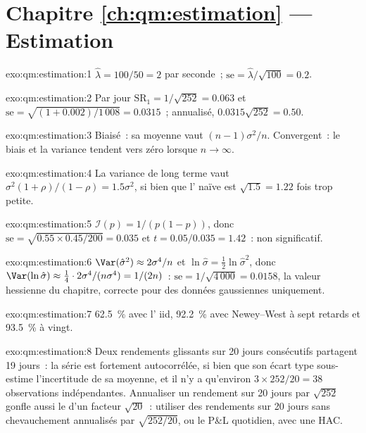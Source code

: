 \section*{Chapitre \ref{ch:qm:estimation} --- Estimation}

\begin{solution}{exo:qm:estimation:1}
$\hat\lambda = 100/50 = 2$ par seconde~; $\mathrm{se} = \hat\lambda/\sqrt{100} = 0.2$.
\end{solution}

\begin{solution}{exo:qm:estimation:2}
Par jour $\mathrm{SR}_1 = 1/\sqrt{252} = 0.063$ et $\mathrm{se} = \sqrt{(1 + 0.002)/1\,008} = 0.0315$~; annualisé, $0.0315\sqrt{252} = 0.50$.
\end{solution}

\begin{solution}{exo:qm:estimation:3}
Biaisé~: sa moyenne vaut $(n - 1)\sigma^2/n$. Convergent~: le biais et la variance tendent vers zéro lorsque $n \to \infty$.
\end{solution}

\begin{solution}{exo:qm:estimation:4}
La variance de long terme vaut $\sigma^2(1 + \rho)/(1 - \rho) = 1.5\sigma^2$, si bien que l' naïve est $\sqrt{1.5} = 1.22$ fois trop petite.
\end{solution}

\begin{solution}{exo:qm:estimation:5}
$\mathcal I(p) = 1/(p(1 - p))$, donc $\mathrm{se} = \sqrt{0.55 \times 0.45/200} = 0.035$ et $t = 0.05/0.035 = 1.42$~: non significatif.
\end{solution}

\begin{solution}{exo:qm:estimation:6}
$\Var(\hat\sigma^2) \approx 2\sigma^4/n$ et $\ln\hat\sigma = \tfrac12\ln\hat\sigma^2$, donc $\Var(\ln\hat\sigma) \approx \tfrac14 \cdot 2\sigma^4/(n\sigma^4) = 1/(2n)$~: $\mathrm{se} =
1/\sqrt{4\,000} = 0.0158$, la valeur hessienne du chapitre, correcte pour des données gaussiennes uniquement.
\end{solution}

\begin{solution}{exo:qm:estimation:7}
62.5~\% avec l' iid, 92.2~\% avec Newey--West à sept retards et 93.5~\% à vingt.
\end{solution}

\begin{solution}{exo:qm:estimation:8}
Deux rendements glissants sur 20 jours consécutifs partagent 19 jours~: la série est fortement autocorrélée, si bien que son écart type sous-estime
l'incertitude de sa moyenne, et il n'y a qu'environ $3 \times 252/20 = 38$ observations indépendantes. Annualiser un rendement sur 20 jours
par $\sqrt{252}$ gonfle aussi le  d'un facteur $\sqrt{20}$~: utiliser des rendements sur 20 jours sans chevauchement annualisés par $\sqrt{252/20}$, ou le P\&L quotidien,
avec une  HAC.
\end{solution}

